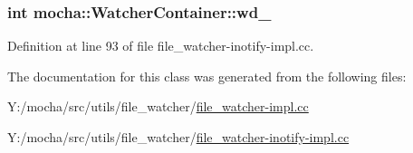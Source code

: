 \hypertarget{classmocha_1_1_watcher_container_a76fa5c4ce7e78992460abc92e5405ee0}{
\subsubsection[{wd\_\-}]{\setlength{\rightskip}{0pt plus 5cm}int {\bf mocha::WatcherContainer::wd\_\-}}}
\label{classmocha_1_1_watcher_container_a76fa5c4ce7e78992460abc92e5405ee0}


Definition at line 93 of file file\_\-watcher-\/inotify-\/impl.cc.



The documentation for this class was generated from the following files:\begin{DoxyCompactItemize}
\item 
Y:/mocha/src/utils/file\_\-watcher/\hyperlink{file__watcher-impl_8cc}{file\_\-watcher-\/impl.cc}\item 
Y:/mocha/src/utils/file\_\-watcher/\hyperlink{file__watcher-inotify-impl_8cc}{file\_\-watcher-\/inotify-\/impl.cc}\end{DoxyCompactItemize}
